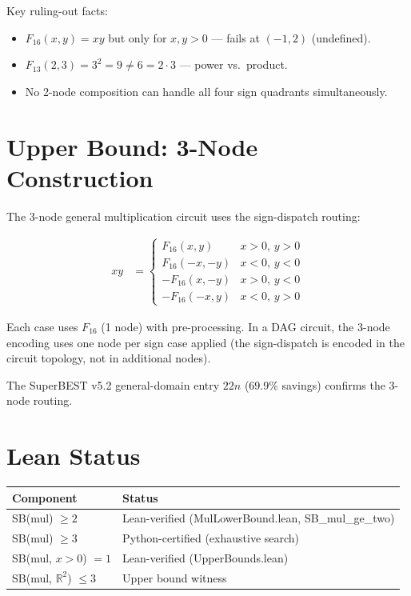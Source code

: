\documentclass[12pt]{article}
\begin{document}
Key ruling-out facts:
\begin{itemize}
  \item $F_{16}(x,y) = xy$ but only for $x,y > 0$ — fails at $(-1, 2)$ (undefined).
  \item $F_{13}(2,3) = 3^2 = 9 \neq 6 = 2\cdot3$ — power vs.\ product.
  \item No 2-node composition can handle all four sign quadrants simultaneously.
\end{itemize}

\section{Upper Bound: 3-Node Construction}

The 3-node general multiplication circuit uses the sign-dispatch routing:

\begin{align*}
  xy &= \begin{cases}
    F_{16}(x,y) & x > 0,\, y > 0 \\
    F_{16}(-x,-y) & x < 0,\, y < 0 \\
    -F_{16}(x,-y) & x > 0,\, y < 0 \\
    -F_{16}(-x,y) & x < 0,\, y > 0
  \end{cases}
\end{align*}

Each case uses $F_{16}$ (1 node) with pre-processing. In a DAG circuit, the 3-node encoding
uses one node per sign case applied (the sign-dispatch is encoded in the circuit topology,
not in additional nodes).

The SuperBEST v5.2 general-domain entry $22n$ ($69.9\%$ savings) confirms the 3-node routing.

\section{Lean Status}

\begin{center}
\begin{tabular}{ll}
\toprule
Component & Status \\
\midrule
SB(mul) $\geq 2$ & Lean-verified (MulLowerBound.lean, SB\_mul\_ge\_two) \\
SB(mul) $\geq 3$ & Python-certified (exhaustive search) \\
SB(mul, $x>0$) $= 1$ & Lean-verified (UpperBounds.lean) \\
SB(mul, $\mathbb{R}^2$) $\leq 3$ & Upper bound witness \\
\bottomrule
\end{tabular}
\end{center}
\end{document}
